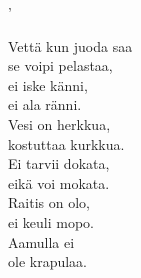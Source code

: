 '

Vettä kun juoda saa \\ se voipi pelastaa, \\ ei iske känni, \\ ei ala ränni. \\ Vesi on herkkua, \\ kostuttaa kurkkua. \\ Ei tarvii dokata, \\ eikä voi mokata. \\ Raitis on olo, \\ ei keuli mopo. \\ Aamulla ei \\ ole krapulaa.